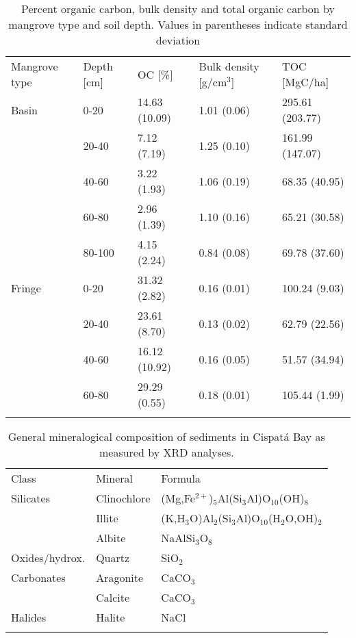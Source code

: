 \begin{table}[H]
\caption{Percent organic carbon, bulk density and total organic carbon by mangrove type and soil depth. Values in parentheses indicate standard deviation}
\label{tab:1}       %
\begin{tabular}{lllll}
\hline\noalign{\smallskip}
Mangrove type & Depth [cm] & OC [\%]  & Bulk density [g/cm$^3$] & TOC [MgC/ha]\\
\noalign{\smallskip}\hline\noalign{\smallskip}
Basin & 0-20 & 14.63 (10.09) & 1.01 (0.06) & 295.61 (203.77)\\
 & 20-40 & 7.12 (7.19) & 1.25 (0.10) & 161.99 (147.07)\\
 & 40-60 & 3.22 (1.93) & 1.06 (0.19) & 68.35 (40.95)\\
 & 60-80 & 2.96 (1.39) & 1.10 (0.16) & 65.21 (30.58)\\
 & 80-100 & 4.15 (2.24) & 0.84 (0.08) & 69.78 (37.60)\\
\noalign{\smallskip}\hline\noalign{\smallskip}
Fringe & 0-20 & 31.32 (2.82) & 0.16 (0.01) & 100.24 (9.03)\\
 & 20-40 & 23.61 (8.70) & 0.13 (0.02) & 62.79 (22.56)\\
 & 40-60 & 16.12 (10.92) & 0.16 (0.05) & 51.57 (34.94)\\
 & 60-80 & 29.29 (0.55) & 0.18 (0.01) & 105.44 (1.99)\\
\noalign{\smallskip}\hline
\end{tabular}
\end{table}

\begin{table}[H]
\caption{General mineralogical composition of sediments in Cispat\'{a} Bay as measured by XRD analyses.}
\label{tab:2}       %
\begin{tabular}{lll}
\hline\noalign{\smallskip}
Class & Mineral  & Formula\\
\noalign{\smallskip}\hline\noalign{\smallskip}
Silicates & Clinochlore & (Mg,Fe$^{2+}$)$_5$Al(Si$_3$Al)O$_{10}$(OH)$_8$\\
& Illite & (K,H$_3$O)Al$_2$(Si$_3$Al)O$_{10}$(H$_2$O,OH)$_2$\\
& Albite & NaAlSi$_3$O$_8$\\
\noalign{\smallskip}\hline\noalign{\smallskip}
Oxides/hydrox. & Quartz & SiO$_2$\\
\noalign{\smallskip}\hline\noalign{\smallskip}
Carbonates & Aragonite & CaCO$_3$\\
& Calcite & CaCO$_3$\\
\noalign{\smallskip}\hline\noalign{\smallskip}
Halides & Halite & NaCl\\
\noalign{\smallskip}\hline
\end{tabular}
\end{table}



